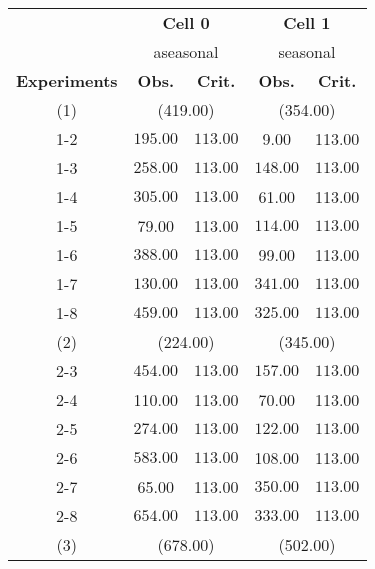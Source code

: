 \begin{table}[ht]
\centering
\small
\begin{tabular*}{\textwidth}{@{\extracolsep{\fill} }ccccc}
  \toprule
& \multicolumn{2}{c}{\textbf{Cell 0}} & \multicolumn{2}{c}{\textbf{Cell 1}} \\
& \multicolumn{2}{c}{aseasonal} & \multicolumn{2}{c}{seasonal} \\
\cmidrule(lr){2-3} \cmidrule(lr){4-5}
\textbf{Experiments} & \textbf{Obs.} & \textbf{Crit.} & \textbf{Obs.} & \textbf{Crit.} \\
  \midrule
  (1) & \multicolumn{2}{c}{(419.00)} & \multicolumn{2}{c}{(354.00)} \\
1-2 & \(\mathbf{195.00}\) & \(\mathbf{113.00}\) & 9.00 & 113.00 \\ 
  1-3 & \(\mathbf{258.00}\) & \(\mathbf{113.00}\) & \(\mathbf{148.00}\) & \(\mathbf{113.00}\) \\ 
  1-4 & \(\mathbf{305.00}\) & \(\mathbf{113.00}\) & 61.00 & 113.00 \\ 
  1-5 & 79.00 & 113.00 & \(\mathbf{114.00}\) & \(\mathbf{113.00}\) \\ 
  1-6 & \(\mathbf{388.00}\) & \(\mathbf{113.00}\) & 99.00 & 113.00 \\ 
  1-7 & \(\mathbf{130.00}\) & \(\mathbf{113.00}\) & \(\mathbf{341.00}\) & \(\mathbf{113.00}\) \\ 
  1-8 & \(\mathbf{459.00}\) & \(\mathbf{113.00}\) & \(\mathbf{325.00}\) & \(\mathbf{113.00}\) \\ 
   [1ex]
(2) & \multicolumn{2}{c}{(224.00)} & \multicolumn{2}{c}{(345.00)} \\   
   2-3 & \(\mathbf{454.00}\) & \(\mathbf{113.00}\) & \(\mathbf{157.00}\) & \(\mathbf{113.00}\) \\ 
  2-4 & 110.00 & 113.00 & 70.00 & 113.00 \\ 
  2-5 & \(\mathbf{274.00}\) & \(\mathbf{113.00}\) & \(\mathbf{122.00}\) & \(\mathbf{113.00}\) \\ 
  2-6 & \(\mathbf{583.00}\) & \(\mathbf{113.00}\) & 108.00 & 113.00 \\ 
  2-7 & 65.00 & 113.00 & \(\mathbf{350.00}\) & \(\mathbf{113.00}\) \\ 
  2-8 & \(\mathbf{654.00}\) & \(\mathbf{113.00}\) & \(\mathbf{333.00}\) & \(\mathbf{113.00}\) \\ 
   [1ex]
(3) & \multicolumn{2}{c}{(678.00)} & \multicolumn{2}{c}{(502.00)} \\   

\end{tabular*}
\end{table}
